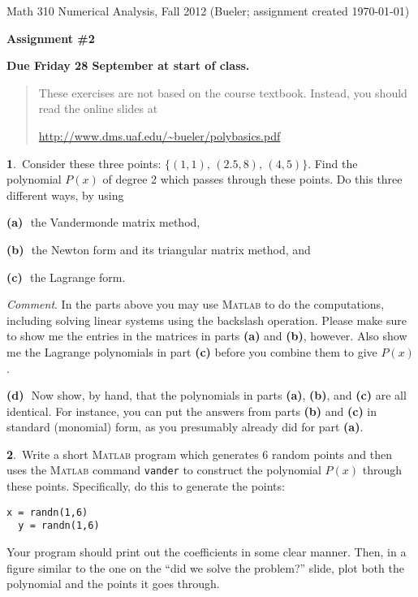 \documentclass[12pt]{amsart}
\newcommand{\normalspacing}{\renewcommand{\baselinestretch}{1.1}
        \tiny\normalsize}
\newcommand{\prob}[1]{\bigskip\noindent\large\textbf{#1}.\,\normalsize }
\newcommand{\epart}[1]{\medskip\noindent\textbf{(#1)}\,\, }
\newcommand{\Matlab}{\textsc{Matlab}\xspace}
\begin{document}
\scriptsize \noindent Math 310 Numerical Analysis, Fall 2012 \hfill (Bueler; assignment created \today)
\normalsize\bigskip

\Large\centerline{\textbf{Assignment \#2}}
\normalsize\medskip

\large
\centerline{\textbf{Due Friday 28 September at start of class.}}
\normalsize\bigskip
\thispagestyle{empty}

\renewcommand{\baselinestretch}{0.5}  \tiny\normalsize
\begin{quote}\small
These exercises are not based on the course textbook.  Instead, you should read the online slides at
  \begin{center}
  \url{http://www.dms.uaf.edu/~bueler/polybasics.pdf}
  \end{center}
\normalsize
\end{quote}
\normalspacing

\bigskip

\prob{1}  Consider these three points:  $\{(1,1),\, (2.5,8), \,(4,5)\}$.  Find the polynomial $P(x)$ of degree 2 which passes through these points.  Do this three different ways, by using

\epart{a} the Vandermonde matrix method,

\epart{b} the Newton form and its triangular matrix method, and

\epart{c} the Lagrange form.

\medskip\noindent\emph{Comment}.  In the parts above you may use \Matlab to do the computations, including solving linear systems using the backslash operation.  Please make sure to show me the entries in the matrices in parts \textbf{(a)} and \textbf{(b)}, however.  Also show me the Lagrange polynomials in part \textbf{(c)} before you combine them to give $P(x)$.

\epart{d}  Now show, by hand, that the polynomials in parts \textbf{(a)}, \textbf{(b)}, and \textbf{(c)} are all identical.  For instance, you can put the answers from parts \textbf{(b)} and \textbf{(c)} in standard (monomial) form, as you presumably already did for part \textbf{(a)}.

\prob{2}  Write a short \Matlab program which generates 6 random points and then uses the \Matlab command \texttt{vander} to construct the polynomial $P(x)$ through these points.  Specifically, do this to generate the points:
\begin{Verbatim}[frame=single,fontfamily=courier,fontsize=\scriptsize]
  x = randn(1,6)
  y = randn(1,6)
\end{Verbatim}
Your program should print out the coefficients in some clear manner.  Then, in a figure similar to the one on the ``did we solve the problem?'' slide, plot both the polynomial and the points it goes through.
\end{document}
